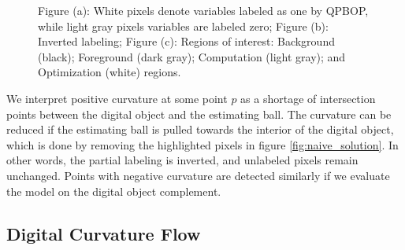 \documentclass[runningheads]{llncs}
\begin{document}
	\begin{figure}[!ht]
		\center
		\hspace{40pt}
		\hspace{40pt}
		\caption{Figure (a): White pixels denote variables labeled as one by QPBOP, while light gray pixels variables are labeled zero; Figure (b): Inverted labeling; Figure (c): Regions of interest: Background (black); Foreground (dark gray); Computation (light gray); and Optimization (white) regions.}	
					
	\end{figure}

        We interpret positive curvature at some point $p$ as a shortage of intersection points between the digital object
        and the estimating ball. The curvature can be reduced if the estimating ball is pulled towards the interior of the
        digital object, which is done by removing the highlighted pixels in figure \ref{fig:naive_solution}. In other words, the partial labeling is inverted, and unlabeled pixels remain unchanged. Points with
        negative curvature are detected similarly if we evaluate the model on the digital object complement.

\subsection{Digital Curvature Flow}
\end{document}
